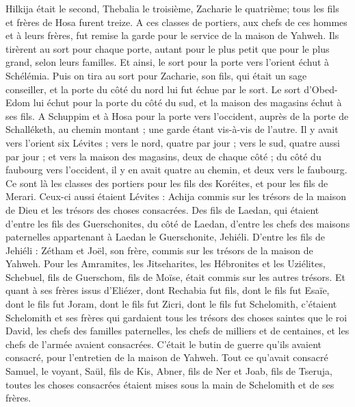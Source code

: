 \begin{multicols}{2}
Hilkija était le second, Thebalia le troisième, Zacharie le quatrième; tous les fils et frères de Hosa furent treize.
A ces classes de portiers, aux chefs de ces hommes et à leurs frères, fut remise la garde pour le service de la maison de Yahweh.
Ils tirèrent au sort pour chaque porte, autant pour le plus petit que pour le plus grand, selon leurs familles.
Et ainsi, le sort pour la porte vers l'orient échut à Schélémia. Puis on tira au sort pour Zacharie, son fils, qui était un sage conseiller, et la porte du côté du nord lui fut échue par le sort.
Le sort d'Obed-Edom lui échut pour la porte du côté du sud, et la maison des magasins échut à ses fils.
A Schuppim et à Hosa pour la porte vers l'occident, auprès de la porte de Schalléketh, au chemin montant ; une garde étant vis-à-vis de l'autre.
Il y avait vers l'orient six Lévites ; vers le nord, quatre par jour ; vers le sud, quatre aussi par jour ; et vers la maison des magasins, deux de chaque côté ;
du côté du faubourg vers l'occident, il y en avait quatre au chemin, et deux vers le faubourg.
Ce sont là les classes des portiers pour les fils des Koréites, et pour les fils de Merari.
Ceux-ci aussi étaient Lévites : Achija commis sur les trésors de la maison de Dieu et les trésors des choses consacrées.
Des fils de Laedan, qui étaient d'entre les fils des Guerschonites, du côté de Laedan, d'entre les chefs des maisons paternelles appartenant à Laedan le Guerschonite, Jehiéli.
D'entre les fils de Jehiéli : Zétham et Joël, son frère, commis sur les trésors de la maison de Yahweh.
Pour les Amramites, les Jitseharites, les Hébronites et les Uziélites,
Schebuel, fils de Guerschom, fils de Moïse, était commis sur les autres trésors.
Et quant à ses frères issus d'Eliézer, dont Rechabia fut fils, dont le fils fut Esaïe, dont le fils fut Joram, dont le fils fut Zicri, dont le fils fut Schelomith,
c'étaient Schelomith et ses frères qui gardaient tous les trésors des choses saintes que le roi David, les chefs des familles paternelles, les chefs de milliers et de centaines, et les chefs de l'armée avaient consacrées.
C'était le butin de guerre qu'ils avaient consacré, pour l'entretien de la maison de Yahweh.
Tout ce qu'avait consacré Samuel, le voyant, Saül, fils de Kis, Abner, fils de Ner et Joab, fils de Tseruja, toutes les choses consacrées étaient mises sous la main de Schelomith et de ses frères.

\end{multicols}
